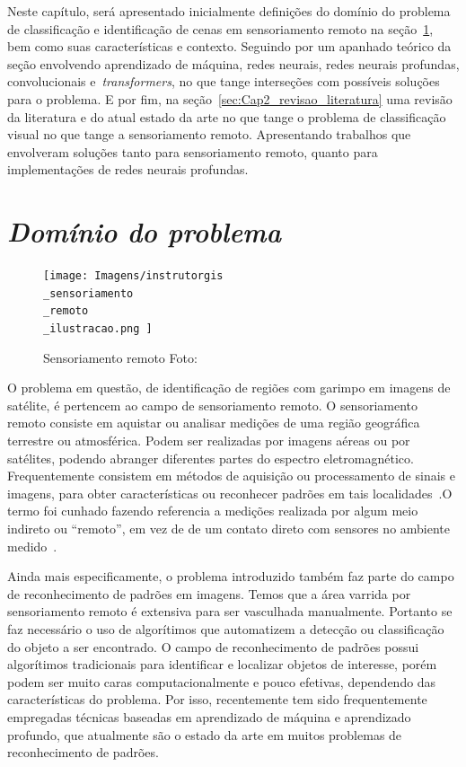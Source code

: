 Neste capítulo, será apresentado inicialmente definições do domínio do problema de classificação e identificação de cenas em sensoriamento remoto na seção~\ref{sec:Cap2_dominio}, bem como suas características e contexto. Seguindo por um apanhado teórico da seção envolvendo aprendizado de máquina, redes neurais, redes neurais profundas, convolucionais e~\textit{transformers}, no que tange interseções com possíveis soluções para o problema.
E por fim, na seção~\ref{sec:Cap2_revisao_literatura} uma revisão da literatura e do atual estado da arte no que tange o problema de classificação visual no que tange a sensoriamento remoto. Apresentando trabalhos que envolveram soluções tanto para sensoriamento remoto, quanto para implementações de redes neurais profundas.



\section{\textit{Domínio do problema}}\label{sec:Cap2_dominio}
\begin{figure}[!ht]
    \centering
    \texttt{[image: 
        Imagens/instrutorgis\\\_sensoriamento\\\_remoto\\\_ilustracao.png
    ]}
    \caption{Sensoriamento remoto Foto:}
\label{fig:sensoriamento}
\end{figure}

O problema em questão, de identificação de regiões com garimpo em imagens de satélite, é pertencem ao campo de sensoriamento remoto. O sensoriamento remoto consiste em aquistar ou analisar medições de uma região geográfica terrestre ou atmosférica. Podem ser realizadas por imagens aéreas ou por satélites, podendo abranger diferentes partes do espectro eletromagnético.
Frequentemente consistem em métodos de aquisição ou processamento de sinais e imagens, para obter características ou reconhecer padrões em tais localidades~\cite{emery2017introduction}.O termo foi cunhado fazendo referencia a medições realizada por algum meio indireto ou “remoto”, em vez de de um contato direto com sensores no ambiente medido~\cite{emery2017introduction}.


Ainda mais especificamente, o problema introduzido também faz parte do campo de reconhecimento de padrões em imagens. Temos que a área varrida por sensoriamento remoto é extensiva para ser vasculhada manualmente. Portanto se faz necessário o uso de algorítimos que automatizem a detecção ou classificação do objeto a ser encontrado.
O campo de reconhecimento de padrões possui algorítimos tradicionais para identificar e localizar objetos de interesse, porém podem ser muito caras computacionalmente e pouco efetivas, dependendo das características do problema. Por isso, recentemente tem sido frequentemente empregadas técnicas baseadas em aprendizado de máquina e aprendizado profundo, que atualmente são o estado da arte em muitos problemas de reconhecimento de padrões.


